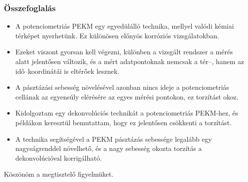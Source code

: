 \documentclass{beamer}
\begin{document}
\begin{frame}
	\frametitle{Összefoglalás}
	\centering
\footnotesize
\begin{itemize}

\item A potenciometriás PEKM egy egyedülálló technika, mellyel valódi kémiai térképet nyerhetünk. Ez különösen előnyös korróziós vizsgálatokban.

\item Ezeket viszont gyorsan kell végezni, különben a vizsgált rendszer a mérés alatt jelentősen változik, és a mért adatpontoknak nemcsak a tér--, hanem az idő--koordinátái is eltérőek lesznek.

\item A pásztázási sebesség növelésével azonban nincs ideje a potenciometriás cellának az egyensúly elérésére az egyes mérési pontokon, ez torzítást okoz.

\item Kidolgoztam egy dekonvolúciós technikát a potenciometriás PEKM-hez, és példákon keresztül bemutattam, hogy ez jelentősen csökkenti a torzítást.

\item A technika segítségével a PEKM pásztázás sebessége legalább egy nagyságrenddel növelhető, és a nagy sebesség okozta torzítás a dekonvolúcióval korrigálható.

\end{itemize}
\end{frame}

\begin{frame}
	\centering
	Köszönöm a megtisztelő figyelmüket.
\end{frame}
\end{document}
